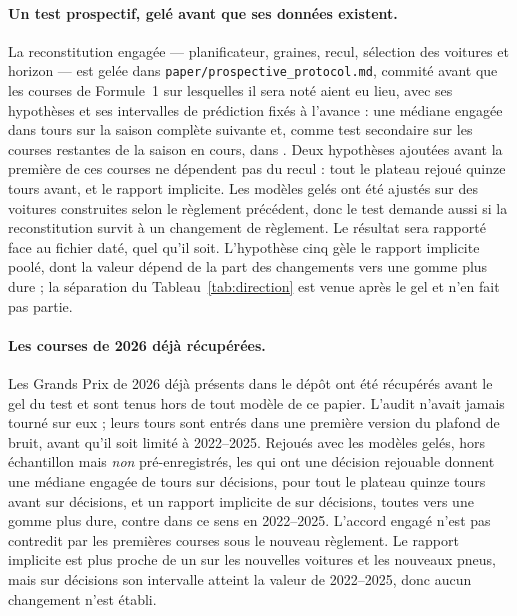\documentclass[11pt,a4paper]{article}
\begin{document}
\paragraph{Un test prospectif, gelé avant que ses données existent.}
\label{sec:prospective}
La reconstitution engagée --- planificateur, graines, recul, sélection des
voitures et horizon --- est gelée dans \texttt{paper/prospective\_protocol.md},
commité avant que les courses de Formule~1 sur lesquelles il sera noté aient eu
lieu, avec ses hypothèses et ses intervalles de prédiction fixés à l'avance : une
médiane engagée dans \ProspectivePiSeason{} tours sur la saison complète suivante
et, comme test secondaire sur les courses restantes de la saison en cours, dans
\ProspectivePiFour{}. Deux hypothèses ajoutées avant la première de ces courses
ne dépendent pas du recul : tout le plateau rejoué quinze tours avant, et le
rapport implicite. Les modèles gelés ont été ajustés sur des voitures construites
selon le règlement précédent, donc le test demande aussi si la reconstitution
survit à un changement de règlement. Le résultat sera rapporté face au fichier
daté, quel qu'il soit. L'hypothèse cinq gèle le rapport implicite poolé, dont la
valeur dépend de la part des changements vers une gomme plus dure ; la
séparation du Tableau~\ref{tab:direction} est venue après le gel et n'en fait
pas partie.

\paragraph{Les courses de 2026 déjà récupérées.} Les \HeldIngested{} Grands Prix
de 2026 déjà présents dans le dépôt ont été récupérés avant le gel du test et
sont tenus hors de tout modèle de ce papier. L'audit n'avait jamais tourné sur
eux ; leurs tours sont entrés dans une première version du plafond de bruit,
avant qu'il soit limité à 2022--2025. Rejoués avec les modèles gelés, hors
échantillon mais \emph{non} pré-enregistrés, les \HeldRaces{} qui ont une
décision rejouable donnent une médiane engagée de \HeldMedian{} tours \HeldCi{}
sur \HeldN{} décisions, \HeldWideMedian{} \HeldWideCi{} pour tout le plateau
quinze tours avant sur \HeldWideN{} décisions, et un rapport implicite de
\HeldImplied{} \HeldImpliedCi{} sur \HeldImpliedN{} décisions, toutes vers une
gomme plus dure, contre \ImpliedHarder{} dans ce sens en 2022--2025. L'accord
engagé n'est pas contredit par les premières courses sous le nouveau règlement. Le rapport implicite est plus proche
de un sur les nouvelles voitures et les nouveaux pneus, mais sur
\HeldImpliedN{} décisions son intervalle atteint la valeur de 2022--2025, donc
aucun changement n'est établi.
\end{document}
